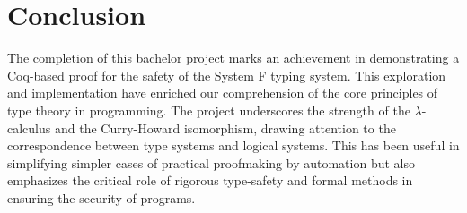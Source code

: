 \documentclass{article}
\begin{document}
\section{Conclusion}
The completion of this bachelor project marks an achievement in demonstrating a Coq-based proof for the safety of the System F typing system. This exploration and implementation have enriched our comprehension of the core principles of type theory in programming. The project underscores the strength of the $\lambda$-calculus and the Curry-Howard isomorphism, drawing attention to the correspondence between type systems and logical systems. This has been useful in simplifying simpler cases of practical proofmaking by automation but also emphasizes the critical role of rigorous type-safety and formal methods in ensuring the security of programs.


\nocite{*} 
\printbibliography
\end{document}
